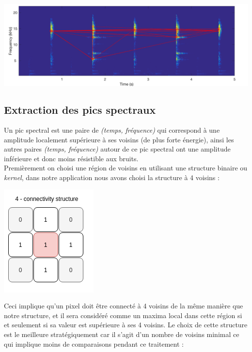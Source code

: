 \documentclass[11pt, report, french]{scrreprt}
\begin{document}
\begin{center}
	\includegraphics[scale=0.25]{img/constellation.png}
\end{center}

\subsection{Extraction des pics spectraux}
Un pic spectral est une paire de \textit{(temps, fréquence)} qui correspond à une amplitude localement supérieure à ses voisins (de plus forte énergie), ainsi les autres paires \textit{(temps, fréquence)} autour de ce pic spectral ont une amplitude inférieure et donc moins résistible aux bruits.\\
Premièrement on choisi une région de voisins en utilisant une structure binaire ou \textit{kernel}, dans notre application nous avons choisi la structure à 4 voisins : 

\begin{center}
	\includegraphics[scale=0.6]{img/struct.png}
\end{center}

Ceci implique qu'un pixel doit être connecté à 4 voisins de la même manière que notre structure, et il sera considéré comme un maxima local dans cette région si et seulement si sa valeur est supérieure à ses 4 voisins. Le choix de cette structure est le meilleure stratégiquement car il s'agit d'un nombre de voisins minimal ce qui implique moins de comparaisons pendant ce traitement :
\end{document}
